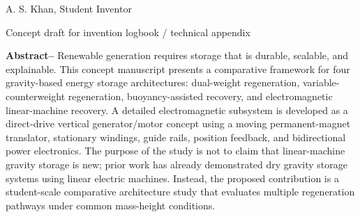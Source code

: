 \documentclass[10.5pt]{article}
\begin{document}
\begin{titlepage}
\thispagestyle{empty}

\vspace*{1.95in}
\begin{center}
{\large A. S. Khan, Student Inventor}\par
\vspace{0.8mm}
{\normalsize Concept draft for invention logbook / technical appendix}\par
\vspace{5mm}
\end{center}

\begin{tcolorbox}[enhanced,colback=panel,colframe=blueprint,boxrule=0.9pt,arc=2pt,left=7pt,right=7pt,top=6pt,bottom=6pt]
\textbf{Abstract--} Renewable generation requires storage that is durable, scalable, and explainable. This concept manuscript presents a comparative framework for four gravity-based energy storage architectures: dual-weight regeneration, variable-counterweight regeneration, buoyancy-assisted recovery, and electromagnetic linear-machine recovery. A detailed electromagnetic subsystem is developed as a direct-drive vertical generator/motor concept using a moving permanent-magnet translator, stationary windings, guide rails, position feedback, and bidirectional power electronics. The purpose of the study is not to claim that linear-machine gravity storage is new; prior work has already demonstrated dry gravity storage systems using linear electric machines. Instead, the proposed contribution is a student-scale comparative architecture study that evaluates multiple regeneration pathways under common mass-height conditions.
\end{tcolorbox}


\end{titlepage}
\end{document}

